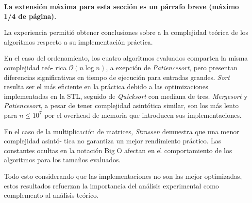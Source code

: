 \begin{mdframed}
    \textbf{La extensión máxima para esta sección es un párrafo breve (máximo 1/4 de página).}
\end{mdframed}

La experiencia permitió obtener conclusiones sobre a la complejidad teórica de los algoritmos respecto a su implementación práctica.

En el caso del ordenamiento, los cuatro algoritmos evaluados comparten la misma complejidad teó-
rica $\mathcal{O}(n \log n)$, a exepción de \textit{Patiencesort}, pero presentan diferencias significativas en tiempo de ejecución para entradas grandes.
\textit{Sort} resulta ser el más eficiente en la práctica debido a las optimizaciones implementadas en la
STL, seguido de \textit{Quicksort} con mediana de tres. \textit{Mergesort} y \textit{Patiencesort}, a pesar de tener complejidad
asintótica similar, son los más lento para $n \leq 10^7$ por el overhead de memoria que introducen sus implementaciones.

 En el caso de la multiplicación de matrices, \textit{Strassen} demuestra que una menor complejidad asintó-
 tica no garantiza un mejor rendimiento práctico. Las constantes ocultas en la notación Big O afectan en el comportamiento de los algoritmos para los tamaños evaluados.
 
 Todo esto considerando que las implementaciones no son las mejor optimizadas, estos resultados refuerzan la importancia del análisis experimental como complemento al análisis teórico.